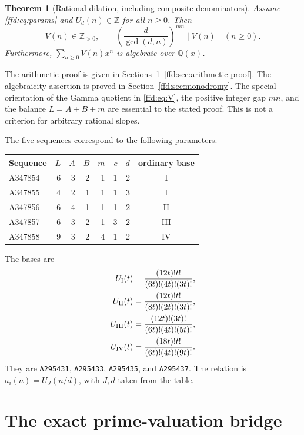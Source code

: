 \documentclass[11pt]{article}
\newtheorem{theorem}{Theorem}[section]
\theoremstyle{definition}
\theoremstyle{remark}
\newcommand{\Z}{\mathbb Z}
\newcommand{\Q}{\mathbb Q}
\newcommand{\OEIS}[1]{\texttt{#1}}
\begin{document}
\begin{theorem}[Rational dilation, including composite denominators]
\label{ffd:thm:general}
Assume \eqref{ffd:eq:params} and $U_d(n)\in\Z$ for all $n\ge0$. Then
\begin{equation}
 V(n)\in\Z_{>0},\qquad
 \left(\frac{d}{\gcd(d,n)}\right)^{mn}\mid V(n)
 \quad(n\ge0).
 \label{ffd:eq:generalintegral}
\end{equation}
Furthermore, $\sum_{n\ge0}V(n)x^n$ is algebraic over $\Q(x)$.
\end{theorem}
The arithmetic proof is given in Sections~\ref{ffd:sec:valuation}--\ref{ffd:sec:arithmetic-proof}.
The algebraicity assertion is proved in Section~\ref{ffd:sec:monodromy}.
The special orientation of the Gamma quotient in \eqref{ffd:eq:V}, the positive
integer gap $mn$, and the balance $L=A+B+m$ are essential to the stated proof.
This is not a criterion for arbitrary rational slopes.

The five sequences correspond to the following parameters.
\begin{center}
\begin{tabular}{lrrrrrrc}
\toprule
Sequence & $L$ &$A$ &$B$ &$m$ &$c$ &$d$ & ordinary base\\
\midrule
A347854&6&3&2&1&1&2&I\\
A347855&4&2&1&1&1&3&I\\
A347856&6&4&1&1&1&2&II\\
A347857&6&3&2&1&3&2&III\\
A347858&9&3&2&4&1&2&IV\\
\bottomrule
\end{tabular}
\end{center}
The bases are
\begin{align}
 U_{\rm I}(t)&=\frac{(12t)!t!}{(6t)!(4t)!(3t)!},\label{ffd:eq:bases}\\
 U_{\rm II}(t)&=\frac{(12t)!t!}{(8t)!(2t)!(3t)!},\nonumber\\
 U_{\rm III}(t)&=\frac{(12t)!(3t)!}{(6t)!(4t)!(5t)!},\nonumber\\
 U_{\rm IV}(t)&=\frac{(18t)!t!}{(6t)!(4t)!(9t)!}.
 \nonumber
\end{align}
They are \OEIS{A295431}, \OEIS{A295433}, \OEIS{A295435}, and
\OEIS{A295437}. The relation is $a_i(n)=U_J(n/d)$, with $J,d$ taken
from the table.

\section{The exact prime-valuation bridge}\label{ffd:sec:valuation}
\end{document}

